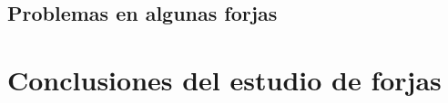 
\subsection{Problemas en algunas forjas}
\label{sub:problemas}


\section{Conclusiones del estudio de forjas}
\label{sec:conclusiones}

